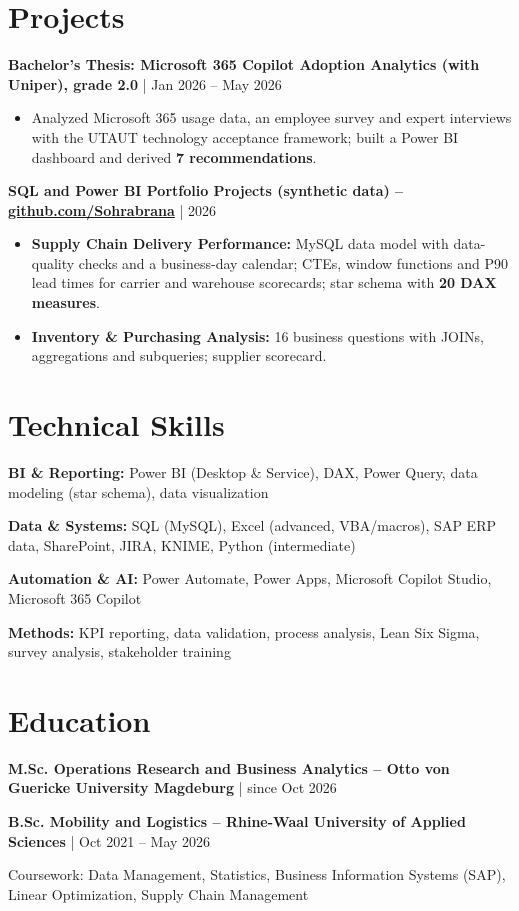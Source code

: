 \documentclass[10pt,a4paper]{article}
\newcommand{\entry}[2]{%
  \vspace{0.22em}%
  {\bfseries #1} | {\color{muted}#2}\par}
\newcommand{\skill}[2]{{\bfseries #1:} #2\par\vspace{0.12em}}
\begin{document}
\section{Projects}

\entry{Bachelor's Thesis: Microsoft 365 Copilot Adoption Analytics (with Uniper), grade 2.0}{Jan 2026 – May 2026}
\begin{itemize}
  \item Analyzed Microsoft 365 usage data, an employee survey and expert interviews with the UTAUT technology acceptance framework; built a Power BI dashboard and derived \textbf{7 recommendations}.
\end{itemize}

\entry{SQL and Power BI Portfolio Projects (synthetic data) – \href{https://github.com/Sohrabrana}{github.com/Sohrabrana}}{2026}
\begin{itemize}
  \item \textbf{Supply Chain Delivery Performance:} MySQL data model with data-quality checks and a business-day calendar; CTEs, window functions and P90 lead times for carrier and warehouse scorecards; star schema with \textbf{20 DAX measures}.
  \item \textbf{Inventory \& Purchasing Analysis:} 16 business questions with JOINs, aggregations and subqueries; supplier scorecard.
\end{itemize}

\section{Technical Skills}
\skill{BI \& Reporting}{Power BI (Desktop \& Service), DAX, Power Query, data modeling (star schema), data visualization}
\skill{Data \& Systems}{SQL (MySQL), Excel (advanced, VBA/macros), SAP ERP data, SharePoint, JIRA, KNIME, Python (intermediate)}
\skill{Automation \& AI}{Power Automate, Power Apps, Microsoft Copilot Studio, Microsoft 365 Copilot}
\skill{Methods}{KPI reporting, data validation, process analysis, Lean Six Sigma, survey analysis, stakeholder training}

\section{Education}
\entry{M.Sc. Operations Research and Business Analytics – Otto von Guericke University Magdeburg}{since Oct 2026}
\entry{B.Sc. Mobility and Logistics – Rhine-Waal University of Applied Sciences}{Oct 2021 – May 2026}
{\small Coursework: Data Management, Statistics, Business Information Systems (SAP), Linear Optimization, Supply Chain Management\par}
\end{document}
